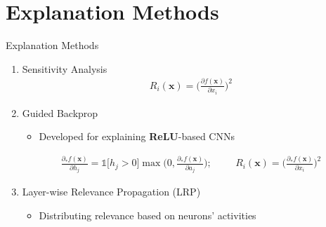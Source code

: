 \documentclass[Nike]{tuberlinbeamer}
\newcommand{\x}[0]{\boldsymbol{x}}
\newcommand{\ppartial}[2]{\frac{\partial #1}{\partial #2}}
\begin{document}
\section{Explanation Methods}
\begin{frame}[allowframebreaks=0.95,t]{Explanation Methods}

\begin{enumerate}
	\item Sensitivity Analysis \citep{SimonyanDeepConvolutionalNetworks2013}
			\begin{align*}
				R_i(\x) = \bigg ( \ppartial{f(\x)}{x_i} \bigg )^2
			\end{align*}
	\item Guided Backprop \citep{SpringenbergStrivingSimplicityAll2015a} \\
		\begin{itemize}
			\item Developed for explaining \textbf{ReLU}-based CNNs
		\end{itemize}
				\begin{align*}
				\frac{\partial_{*} f(\x) }{\partial h_j} = \mathds{1} \bigg[  h_j > 0 \bigg]\max\bigg( 0, \frac{\partial_{*} f(\x) }{\partial a_j} \bigg);\hspace{1cm} R_i(\x) = \bigg( \frac{\partial_{*} f(\x) }{\partial x_i} \bigg )^2
			\end{align*}
	\framebreak
	
	\item Layer-wise Relevance Propagation (LRP) \citep{BinderLayerWiseRelevancePropagation2016} 
		\begin{itemize}
			\item Distributing relevance based on neurons' activities
			\begin{columns}
\end{columns}
\end{itemize}
\end{enumerate}
\end{frame}
\end{document}
